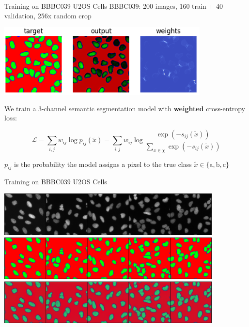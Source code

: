 \documentclass[aspectratio=1610]{beamer}					%
\begin{document}
\begin{frame}{Training on BBBC039 U2OS Cells}
\vspace{0.1in}
BBBC039: 200 images, 160 train + 40 validation, 256\;x random crop

\begin{center}
\includegraphics[width=0.8\textwidth]{weights.png}
\end{center}

We train a 3-channel semantic segmentation model with \textbf{weighted} cross-entropy loss:

\begin{equation*}
\mathcal{L} = \sum_{i,j} w_{ij}\log p_{ij}(\tilde{x}) = \sum_{i,j} w_{ij}\log \frac{\exp(-s_{ij}(\tilde{x}))}{\sum_{x\in\chi} \exp(-s_{ij}(\tilde{x}))}
\end{equation*}

$p_{ij}$ is the probability the model assigns a pixel to the true class $\tilde{x} \in \{\textrm{a}, \textrm{b}, \textrm{c}\}$

\end{frame}

\begin{frame}{Training on BBBC039 U2OS Cells}

\begin{center}
\includegraphics[width=0.85\textwidth]{input-train.png}
\includegraphics[width=0.85\textwidth]{target-train.png}
\includegraphics[width=0.85\textwidth]{output-train.png}
\end{center}

\end{frame}
\end{document}
